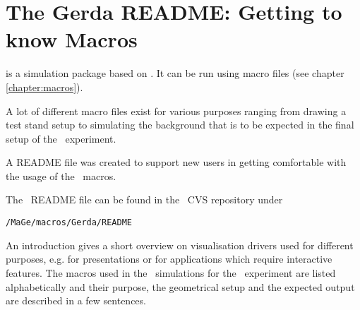 
\label{chapter:start}


\section{The Gerda README: Getting to know Macros}
\label{sec:README}

\mage is a simulation package based on \geant. It can be run using macro files (see chapter \ref{chapter:macros}).

A lot of different macro files exist for various purposes ranging from drawing a test stand setup to simulating the background that is to be expected in the final setup of the \gerda \ experiment.

A README file was created to support new users in getting comfortable with the usage of the \gerda \ macros.

The \gerda \ README file can be found in the \gerda \ CVS repository under 
\begin{lstlisting}
/MaGe/macros/Gerda/README
\end{lstlisting}
An introduction gives a short overview on visualisation drivers used for different purposes, e.g. for presentations or for applications which require interactive features.
The macros used in the \mage \ simulations for the \gerda \ experiment are listed alphabetically and their purpose, the geometrical setup and the expected output are described in a few sentences.


 
